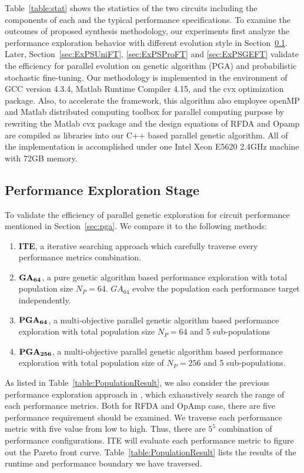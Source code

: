     Table~\ref{table:stat} shows the statistics of the two circuits including the components of each and the typical performance specifications. To examine the outcomes of proposed synthesis methodology, our experiments first analyze the performance exploration behavior with different evolution style in Section~\ref{sec:ExPerf}. Later, Section~\ref{sec:ExPSUniFT}, \ref{sec:ExPSProFT} and \ref{sec:ExPSGEFT} validate the efficiency for parallel evolution on genetic algorithm (PGA) and probabilistic stochastic fine-tuning. Our methodology is implemented in the environment of GCC version 4.3.4, Matlab Runtime Compiler 4.15, and the cvx optimization package. Also, to accelerate the framework, this algorithm also employee openMP and Matlab distributed computing toolbox for parallel computing purpose by rewriting the Matlab cvx package and the design equations of RFDA and Opamp are compiled as libraries into our C++ based parallel genetic algorithm. All of the implementation is accomplished under one Intel Xeon E5620 2.4GHz machine with 72GB memory.
      
    

    \subsection{Performance Exploration Stage}\label{sec:ExPerf}

      To validate the efficiency of parallel genetic exploration for circuit performance mentioned in Section~\ref{sec:pga}. We compare it to the following methods: 
      \begin{enumerate}
          \item {\bf ITE}, a iterative searching approach which carefully traverse every performance metrics combination. 
          \item {$\bf GA_{64}$}, a pure genetic algorithm based performance exploration with total population size $N_P=64$. $GA_{64}$ evolve the population each performance target independently. 
          \item {$\bf PGA_{64}$}, a multi-objective parallel genetic algorithm based performance exploration with total population size $N_P=64$ and 5 sub-populations
          \item {$\bf PGA_{256}$}, a multi-objective parallel genetic algorithm based performance exploration with total population size of $N_P=256$ and 5 sub-populations.
      \end{enumerate}

      As listed in Table~\ref{table:PopulationResult}, we also consider the previous performance exploration approach in \cite{PerfMap_ISQED2011}, which exhaustively search the range of each performance metrics. Both for RFDA and OpAmp case, there are five performance requirement should be examined. We traverse each performance metric with five value from low to high. Thus, there are $5^5$ combination of performance configurations. {\bf} ITE will evaluate each performance metric to figure out the Pareto front curve. Table~\ref{table:PopulationResult} lists the results of the runtime and performance boundary we have traversed.

